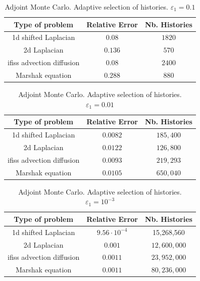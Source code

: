 \documentclass[a4paper,10pt]{article}
\begin{document}
\begin{table}[!h]
\centering
\begin{tabular}{|c|c|c|}
\hline
\textbf{Type of problem} & \textbf{Relative Error} &\textbf{Nb. Histories}\\
\hline
1d shifted Laplacian & $0.08$ & $1820$\\
\hline
2d Laplacian & $0.136$ & $570$\\
\hline
ifiss advection diffusion & $0.08$  & $2400$\\
\hline
Marshak equation & $0.288$ & $880$\\
\hline
\end{tabular}
\caption{Adjoint Monte Carlo. Adaptive selection of histories.
$\varepsilon_1=0.1$}
\label{tab:Adj_adapt}
\end{table}

\begin{table}[!h]
\centering
\begin{tabular}{|c|c|c|}
\hline
\textbf{Type of problem} & \textbf{Relative Error} &\textbf{Nb. Histories}\\
\hline
1d shifted Laplacian & $0.0082$ & $185,400$\\
\hline
2d Laplacian & $0.0122$ & $126,800$\\
\hline
ifiss advection diffusion & $0.0093$  & $219,293$\\
\hline
Marshak equation & $0.0105$ & $650,040$\\
\hline
\end{tabular}
\caption{Adjoint Monte Carlo. Adaptive selection of histories.
$\varepsilon_1=0.01$}
\label{tab:Adj_adapt2}
\end{table}


\begin{table}[!h]
\centering
\begin{tabular}{|c|c|c|}
\hline
\textbf{Type of problem} & \textbf{Relative Error} &\textbf{Nb. Histories}\\
\hline
1d shifted Laplacian & $9.56 \cdot 10^{-4}$ & 15,268,560 \\
\hline
2d Laplacian & $0.001$ & $12,600,000$\\
\hline
ifiss advection diffusion & $0.0011$  & $23,952,000$\\
\hline
Marshak equation & $0.0011$ &  $80,236,000$\\
\hline
\end{tabular}
\caption{Adjoint Monte Carlo. Adaptive selection of histories.
$\varepsilon_1=10^{-3}$}
\label{tab:Adj_adapt3}
\end{table}
\end{document}
